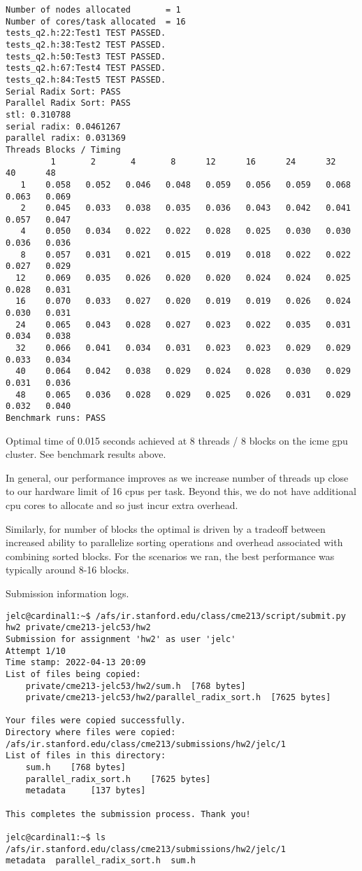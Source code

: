 \documentclass[12pt,letterpaper,twoside]{article}
\begin{document}
\begin{itemize}
\begin{verbatim}
Number of nodes allocated		= 1
Number of cores/task allocated 	= 16
tests_q2.h:22:Test1	TEST PASSED.
tests_q2.h:38:Test2	TEST PASSED.
tests_q2.h:50:Test3	TEST PASSED.
tests_q2.h:67:Test4	TEST PASSED.
tests_q2.h:84:Test5	TEST PASSED.
Serial Radix Sort: PASS
Parallel Radix Sort: PASS
stl: 0.310788
serial radix: 0.0461267
parallel radix: 0.031369
Threads Blocks / Timing
         1       2       4       8      12      16      24      32      40      48
   1    0.058   0.052   0.046   0.048   0.059   0.056   0.059   0.068   0.063   0.069
   2    0.045   0.033   0.038   0.035   0.036   0.043   0.042   0.041   0.057   0.047
   4    0.050   0.034   0.022   0.022   0.028   0.025   0.030   0.030   0.036   0.036
   8    0.057   0.031   0.021   0.015   0.019   0.018   0.022   0.022   0.027   0.029
  12    0.069   0.035   0.026   0.020   0.020   0.024   0.024   0.025   0.028   0.031
  16    0.070   0.033   0.027   0.020   0.019   0.019   0.026   0.024   0.030   0.031
  24    0.065   0.043   0.028   0.027   0.023   0.022   0.035   0.031   0.034   0.038
  32    0.066   0.041   0.034   0.031   0.023   0.023   0.029   0.029   0.033   0.034
  40    0.064   0.042   0.038   0.029   0.024   0.028   0.030   0.029   0.031   0.036
  48    0.065   0.036   0.028   0.029   0.025   0.026   0.031   0.029   0.032   0.040
Benchmark runs: PASS
\end{verbatim} 
    
    Optimal time of 0.015 seconds achieved at 8 threads / 8 blocks on the icme gpu cluster.
    See benchmark results above.

    In general, our performance improves as we increase number of threads up close to our 
    hardware limit of 16 cpus per task. Beyond this, we do not have additional cpu cores to 
    allocate and so just incur extra overhead.
    
    Similarly, for number of blocks the optimal is driven by a tradeoff between increased ability 
    to parallelize sorting operations and overhead associated with combining sorted blocks. 
    For the scenarios we ran, the best performance was typically around 8-16 blocks.

\end{itemize}


Submission information logs.
\begin{verbatim}
jelc@cardinal1:~$ /afs/ir.stanford.edu/class/cme213/script/submit.py hw2 private/cme213-jelc53/hw2
Submission for assignment 'hw2' as user 'jelc'
Attempt 1/10
Time stamp: 2022-04-13 20:09
List of files being copied:
    private/cme213-jelc53/hw2/sum.h	 [768 bytes]
    private/cme213-jelc53/hw2/parallel_radix_sort.h	 [7625 bytes]

Your files were copied successfully.
Directory where files were copied: /afs/ir.stanford.edu/class/cme213/submissions/hw2/jelc/1
List of files in this directory:
    sum.h	 [768 bytes]
    parallel_radix_sort.h	 [7625 bytes]
    metadata	 [137 bytes]

This completes the submission process. Thank you!

jelc@cardinal1:~$ ls /afs/ir.stanford.edu/class/cme213/submissions/hw2/jelc/1
metadata  parallel_radix_sort.h  sum.h
\end{verbatim}
\end{document}
